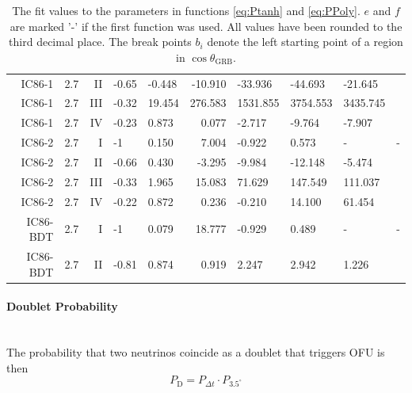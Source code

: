\begin{table}[h]
\begin{tabular}{r|c|r||l|l|r|l|l|l|l}
IC86-1 & 2.7 & II & -0.65 & -0.448 & -10.910 & -33.936 & -44.693 & -21.645 \\
IC86-1 & 2.7 & III & -0.32 & 19.454 & 276.583 & 1531.855 & 3754.553 & 3435.745 
\\
IC86-1 & 2.7 & IV &  -0.23 & 0.873 & 0.077 & -2.717 & -9.764 &  -7.907 \\
\hline
IC86-2 & 2.7 & I & -1 & 0.150 & 7.004 & -0.922 & 0.573 & - & - \\
IC86-2 & 2.7 & II & -0.66 & 0.430 & -3.295 & -9.984 & -12.148 & -5.474 \\
IC86-2 & 2.7 & III & -0.33 & 1.965 & 15.083 & 71.629 & 147.549 & 111.037 \\
IC86-2 & 2.7 & IV & -0.22 & 0.872 & 0.236 & -0.210 & 14.100 & 61.454 \\
\hline
IC86-BDT & 2.7 & I & -1 & 0.079 & 18.777 & -0.929 & 0.489 & - & -  \\
IC86-BDT & 2.7 & II & -0.81 & 0.874 & 0.919 & 2.247 & 2.942 & 1.226 \\
  \end{tabular}
  \caption{The fit values to the parameters in functions \ref{eq:Ptanh} and 
\ref{eq:PPoly}. $e$ and $f$ are marked '-' if the first function was used. All 
values have been rounded to the third decimal place. The break points $b_i$ 
denote the left starting point of a region in $\cos \theta_\text{GRB}$.}
  \label{tab:P3p5fitvalues}
\end{table}


%   

\paragraph{Doublet Probability}$\;$\\
The probability that two neutrinos coincide as a doublet that triggers OFU is 
then
\begin{equation}
 P_\text{D} = P_{\Delta t} \cdot P_{3.5^\circ}
\end{equation}


